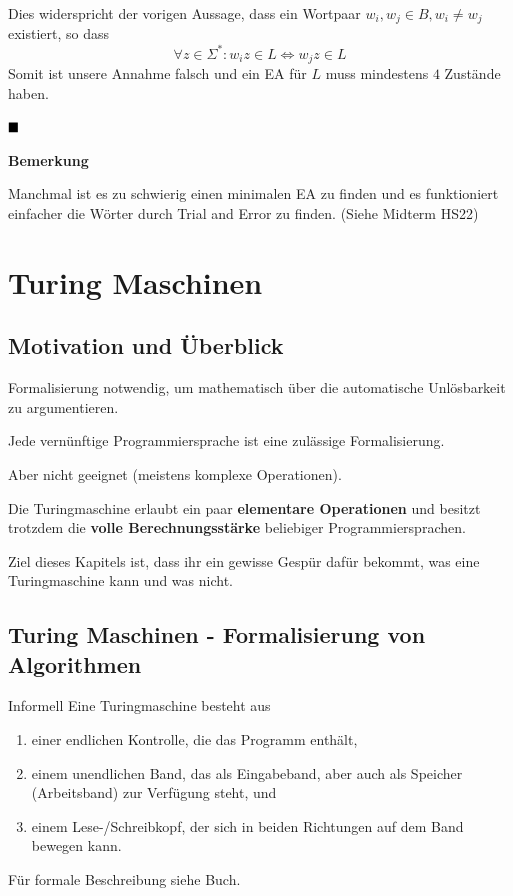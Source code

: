 \documentclass[a4paper, 11pt]{article}
\begin{document}
        Dies widerspricht der vorigen Aussage, dass ein Wortpaar $w_i, w_j \in B, w_i \neq w_j$ existiert, so dass
        $$\forall z \in \Sigma^*: w_iz \in L \iff w_jz \in L$$
        Somit ist unsere Annahme falsch und ein EA für $L$ muss mindestens $4$ Zustände haben.
    
        $\hfill\blacksquare$
    
        \textbf{Bemerkung}

        Manchmal ist es zu schwierig einen minimalen EA zu finden und es funktioniert einfacher die Wörter durch Trial and Error zu finden. (Siehe Midterm HS22)
    
    
    
    \section{Turing Maschinen}
    
    
        \subsection{Motivation und Überblick}
        Formalisierung notwendig, um mathematisch über die automatische Unlösbarkeit zu argumentieren.
    
        Jede vernünftige Programmiersprache ist eine zulässige Formalisierung. 
    
        Aber nicht geeignet (meistens komplexe Operationen).
    
        Die Turingmaschine erlaubt ein paar \textbf{elementare Operationen} und besitzt trotzdem die \textbf{volle Berechnungsstärke} beliebiger Programmiersprachen.
    
        Ziel dieses Kapitels ist, dass ihr ein gewisse Gespür dafür bekommt, was eine Turingmaschine kann und was nicht.
    
    
    
        \subsection{Turing Maschinen - Formalisierung von Algorithmen}
        \begin{subbox}{Informell}
            Eine Turingmaschine besteht aus 
            \begin{enumerate}[label=(\roman*)]
                \item einer endlichen Kontrolle, die das Programm enthält,
                \item einem unendlichen Band, das als Eingabeband, aber auch als Speicher (Arbeitsband) zur Verfügung steht, und 
                \item einem Lese-/Schreibkopf, der sich in beiden Richtungen auf dem Band bewegen kann.
            \end{enumerate}
        \end{subbox}
        Für formale Beschreibung siehe Buch.
    
\end{document}
